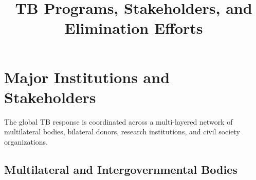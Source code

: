 \documentclass[11pt]{article}
\title{TB Programs, Stakeholders, and Elimination Efforts}
\author{}
\date{}
\begin{document}
\maketitle
\tableofcontents
\newpage

\section{Major Institutions and Stakeholders}
\label{sec:institutions}

The global TB response is coordinated across a multi-layered network of multilateral bodies, bilateral donors, research institutions, and civil society organizations.

\subsection{Multilateral and Intergovernmental Bodies}
\end{document}
